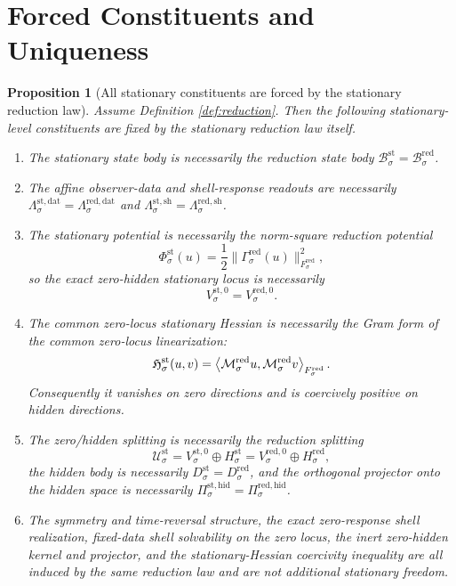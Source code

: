 \documentclass[11pt]{article}
\newcommand{\StatSpace}[1]{\mathcal U_{#1}^{\mathrm{st}}}
\newcommand{\StatBody}[1]{\mathcal B_{#1}^{\mathrm{st}}}
\newcommand{\StatData}[1]{\Lambda_{#1}^{\mathrm{st,dat}}}
\newcommand{\StatShell}[1]{\Lambda_{#1}^{\mathrm{st,sh}}}
\newcommand{\StatPotential}[1]{\Phi_{#1}^{\mathrm{st}}}
\newcommand{\StatZero}[1]{V_{#1}^{\mathrm{st},0}}
\newcommand{\StatHidden}[1]{H_{#1}^{\mathrm{st}}}
\newcommand{\StatHiddenBody}[1]{D_{#1}^{\mathrm{st}}}
\newcommand{\StatProj}[1]{\Pi_{#1}^{\mathrm{st,hid}}}
\newcommand{\StatHess}[1]{\mathfrak H_{#1}^{\mathrm{st}}}
\newcommand{\RedBody}[1]{\mathcal B_{#1}^{\mathrm{red}}}
\newcommand{\RedData}[1]{\Lambda_{#1}^{\mathrm{red,dat}}}
\newcommand{\RedShell}[1]{\Lambda_{#1}^{\mathrm{red,sh}}}
\newcommand{\RedTarget}[1]{F_{#1}^{\mathrm{red}}}
\newcommand{\RedMap}[1]{\Gamma_{#1}^{\mathrm{red}}}
\newcommand{\RedZero}[1]{V_{#1}^{\mathrm{red},0}}
\newcommand{\RedHidden}[1]{H_{#1}^{\mathrm{red}}}
\newcommand{\RedHiddenBody}[1]{D_{#1}^{\mathrm{red}}}
\newcommand{\RedProj}[1]{\Pi_{#1}^{\mathrm{red,hid}}}
\newcommand{\RedLin}[1]{\mathcal M_{#1}^{\mathrm{red}}}
\newtheorem{proposition}{Proposition}
\begin{document}
\section{Forced Constituents and Uniqueness}

\begin{proposition}[All stationary constituents are forced by the stationary reduction law]
\label{prop:forced}
Assume Definition \ref{def:reduction}. Then the following stationary-level constituents are fixed by the stationary reduction law itself.
\begin{enumerate}
    \item The stationary state body is necessarily the reduction state body \(\StatBody{\sigma}=\RedBody{\sigma}\).
    \item The affine observer-data and shell-response readouts are necessarily \(\StatData{\sigma}=\RedData{\sigma}\) and \(\StatShell{\sigma}=\RedShell{\sigma}\).
    \item The stationary potential is necessarily the norm-square reduction potential
    \[
    \StatPotential{\sigma}(u)
    =
    \frac{1}{2}\|\RedMap{\sigma}(u)\|_{\RedTarget{\sigma}}^{2},
    \]
    so the exact zero-hidden stationary locus is necessarily
    \[
    \StatZero{\sigma}=\RedZero{\sigma}.
    \]
    \item The common zero-locus stationary Hessian is necessarily the Gram form of the common zero-locus linearization:
    \[
    \StatHess{\sigma}(u,v)
    =
    \ev{\RedLin{\sigma}u,\RedLin{\sigma}v}_{\RedTarget{\sigma}}.
    \]
    Consequently it vanishes on zero directions and is coercively positive on hidden directions.
    \item The zero/hidden splitting is necessarily the reduction splitting
    \[
    \StatSpace{\sigma}
    =
    \StatZero{\sigma}\oplus\StatHidden{\sigma}
    =
    \RedZero{\sigma}\oplus\RedHidden{\sigma},
    \]
    the hidden body is necessarily \(\StatHiddenBody{\sigma}=\RedHiddenBody{\sigma}\), and the orthogonal projector onto the hidden space is necessarily \(\StatProj{\sigma}=\RedProj{\sigma}\).
    \item The symmetry and time-reversal structure, the exact zero-response shell realization, fixed-data shell solvability on the zero locus, the inert zero-hidden kernel and projector, and the stationary-Hessian coercivity inequality are all induced by the same reduction law and are not additional stationary freedom.
\end{enumerate}
\end{proposition}
\end{document}
